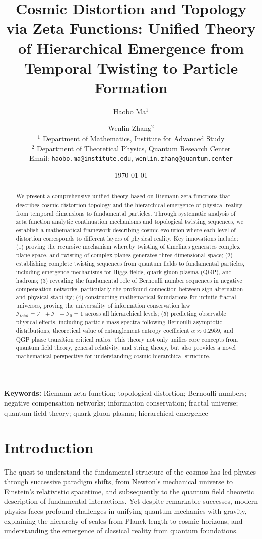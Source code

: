 \documentclass[11pt]{article}
\title{\textbf{Cosmic Distortion and Topology via Zeta Functions: Unified Theory of Hierarchical Emergence from Temporal Twisting to Particle Formation}}
\author{
Haobo Ma$^1$ \and Wenlin Zhang$^2$ \\
$^1$ Department of Mathematics, Institute for Advanced Study \\
$^2$ Department of Theoretical Physics, Quantum Research Center \\
Email: \texttt{haobo.ma@institute.edu}, \texttt{wenlin.zhang@quantum.center}
}
\date{\today}
\begin{document}
\maketitle

\begin{abstract}
We present a comprehensive unified theory based on Riemann zeta functions that describes cosmic distortion topology and the hierarchical emergence of physical reality from temporal dimensions to fundamental particles. Through systematic analysis of zeta function analytic continuation mechanisms and topological twisting sequences, we establish a mathematical framework describing cosmic evolution where each level of distortion corresponds to different layers of physical reality. Key innovations include: (1) proving the recursive mechanism whereby twisting of timelines generates complex plane space, and twisting of complex planes generates three-dimensional space; (2) establishing complete twisting sequences from quantum fields to fundamental particles, including emergence mechanisms for Higgs fields, quark-gluon plasma (QGP), and hadrons; (3) revealing the fundamental role of Bernoulli number sequences in negative compensation networks, particularly the profound connection between sign alternation and physical stability; (4) constructing mathematical foundations for infinite fractal universes, proving the universality of information conservation law $\mathcal{I}_{total} = \mathcal{I}_+ + \mathcal{I}_- + \mathcal{I}_0 = 1$ across all hierarchical levels; (5) predicting observable physical effects, including particle mass spectra following Bernoulli asymptotic distributions, theoretical value of entanglement entropy coefficient $\alpha \approx 0.2959$, and QGP phase transition critical ratios. This theory not only unifies core concepts from quantum field theory, general relativity, and string theory, but also provides a novel mathematical perspective for understanding cosmic hierarchical structure.
\end{abstract}

\textbf{Keywords:} Riemann zeta function; topological distortion; Bernoulli numbers; negative compensation networks; information conservation; fractal universe; quantum field theory; quark-gluon plasma; hierarchical emergence

\section{Introduction}

The quest to understand the fundamental structure of the cosmos has led physics through successive paradigm shifts, from Newton's mechanical universe to Einstein's relativistic spacetime, and subsequently to the quantum field theoretic description of fundamental interactions. Yet despite remarkable successes, modern physics faces profound challenges in unifying quantum mechanics with gravity, explaining the hierarchy of scales from Planck length to cosmic horizons, and understanding the emergence of classical reality from quantum foundations.
\end{document}
